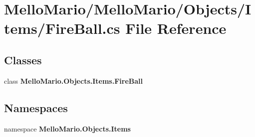 \section{Mello\+Mario/\+Mello\+Mario/\+Objects/\+Items/\+Fire\+Ball.cs File Reference}
\label{FireBall_8cs}
\subsection*{Classes}
\begin{DoxyCompactItemize}
\item 
class \textbf{ Mello\+Mario.\+Objects.\+Items.\+Fire\+Ball}
\end{DoxyCompactItemize}
\subsection*{Namespaces}
\begin{DoxyCompactItemize}
\item 
namespace \textbf{ Mello\+Mario.\+Objects.\+Items}
\end{DoxyCompactItemize}
